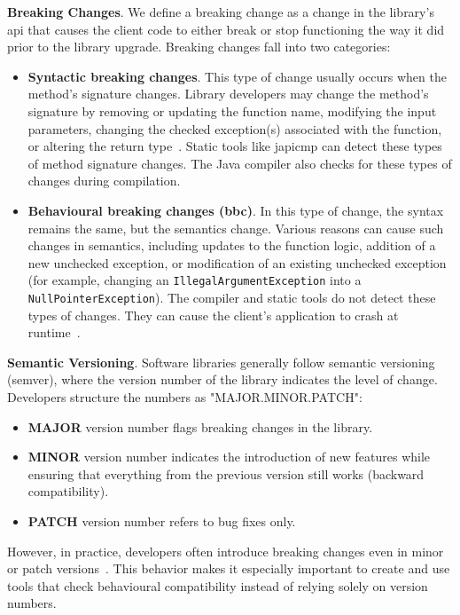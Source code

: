 \textbf{Breaking Changes}. We define a breaking change as a change in the library's \gls{api} that causes the client code to either break or stop functioning the way it did prior to the library upgrade. Breaking changes fall into two categories:
\begin{itemize}
    \item \textbf{Syntactic breaking changes}. This type of change usually occurs when the method's signature changes. Library developers may change the method's signature by removing or updating the function name, modifying the input parameters, changing the checked exception(s) associated with the function, or altering the return type~\cite{Hovemeyer2004}. Static tools like japicmp can detect these types of method signature changes. The Java compiler also checks for these types of changes during compilation.
    \item \textbf{Behavioural breaking changes (\gls{bbc})}. In this type of change, the syntax remains the same, but the semantics change. Various reasons can cause such changes in semantics, including updates to the function logic, addition of a new unchecked exception, or modification of an existing unchecked exception (for example, changing an \texttt{IllegalArgumentException} into a \texttt{NullPointerException}). The compiler and static tools do not detect these types of changes. They can cause the client's application to crash at runtime~\cite{Cossette2012}.
\end{itemize}

\textbf{Semantic Versioning}. Software libraries generally follow semantic versioning (semver), where the version number of the library indicates the level of change. Developers structure the numbers as "MAJOR.MINOR.PATCH":
\begin{itemize}
    \item \textbf{MAJOR} version number flags breaking changes in the library.
    \item \textbf{MINOR} version number indicates the introduction of new features while ensuring that everything from the previous version still works (backward compatibility).
    \item \textbf{PATCH} version number refers to bug fixes only.
\end{itemize}
However, in practice, developers often introduce breaking changes even in minor or patch versions~\cite{jayasuriya24:_under_apis}. This behavior makes it especially important to create and use tools that check behavioural compatibility instead of relying solely on version numbers.

